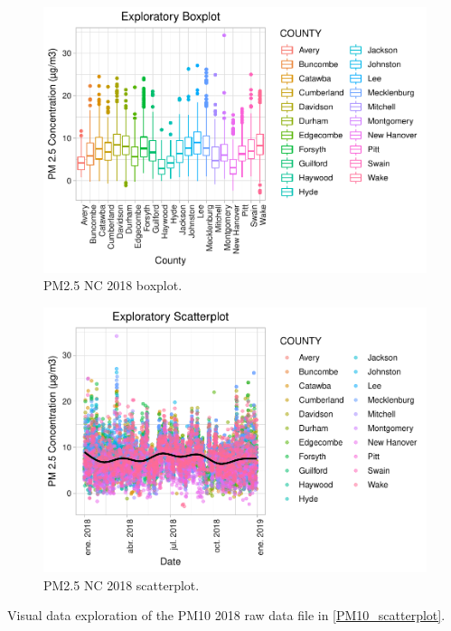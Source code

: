 \documentclass[12pt,]{article}
\begin{document}
\begin{figure}
\centering
\includegraphics{./Outputunnamed-chunk-12-1.pdf}
\caption{PM2.5 NC 2018 boxplot. \label{PM2.5_boxplot}}
\end{figure}

\begin{figure}
\centering
\includegraphics{./Outputunnamed-chunk-13-1.pdf}
\caption{PM2.5 NC 2018 scatterplot. \label{PM2.5_scatterplot}}
\end{figure}

Visual data exploration of the PM10 2018 raw data file in
\autoref{PM10_scatterplot}.
\end{document}
